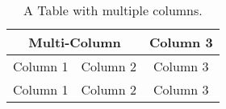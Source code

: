 \documentclass[twocolumn]{aastex631}
\begin{document}
\begin{table}[h]
    \centering
    \caption{A Table with multiple columns.}
    \label{tab:multicol}
    \vspace{.2in}

        \begin{tabular}{c|c|c}
            \toprule
            \multicolumn{2}{c|}{Multi-Column}   & Column 3 \\
            \midrule
                        Column 1 & Column 2     & Column 3 \\
                        Column 1 & Column 2     & Column 3 \\
            \bottomrule
        \end{tabular}
\end{table}

\end{document}
